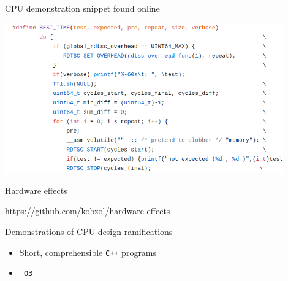 \documentclass[hyperref={pdfpagelabels=false}]{beamer}
\begin{document}
\begin{frame}{CPU demonstration snippet found online}
	\begin{tcolorbox}
		\centering \includegraphics[width=0.9\textwidth]{lemire_short_tp}
	\end{tcolorbox}
\end{frame}

\begin{frame}{Hardware effects}
	\begin{center}{\large \url{https://github.com/kobzol/hardware-effects}}

	\vspace{3mm}
	Demonstrations of CPU design ramifications\end{center}

	\begin{itemize}
		\item<2-> Short, comprehensible \texttt{C++} programs
		\item<3> \texttt{-O3} 
	\end{itemize}
\end{frame}
\end{document}
